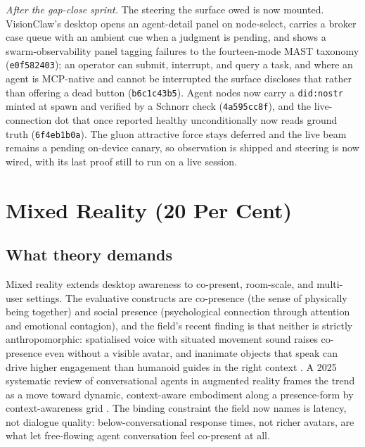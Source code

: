 \emph{After the gap-close sprint.} The steering the surface owed is now mounted. VisionClaw's desktop opens an agent-detail panel on node-select, carries a broker case queue with an ambient cue when a judgment is pending, and shows a swarm-observability panel tagging failures to the fourteen-mode MAST taxonomy (\texttt{e0f582403}); an operator can submit, interrupt, and query a task, and where an agent is MCP-native and cannot be interrupted the surface discloses that rather than offering a dead button (\texttt{b6c1c43b5}). Agent nodes now carry a \texttt{did:nostr} minted at spawn and verified by a Schnorr check (\texttt{4a595cc8f}), and the live-connection dot that once reported healthy unconditionally now reads ground truth (\texttt{6f4eb1b0a}). The gluon attractive force stays deferred and the live beam remains a pending on-device canary, so observation is shipped and steering is now wired, with its last proof still to run on a live session.

\section{Mixed Reality (20 Per Cent)}

\subsection{What theory demands}

Mixed reality extends desktop awareness to co-present, room-scale, and multi-user settings. The evaluative constructs are co-presence (the sense of physically being together) and social presence (psychological connection through attention and emotional contagion), and the field's recent finding is that neither is strictly anthropomorphic: spatialised voice with situated movement sound raises co-presence even without a visible avatar, and inanimate objects that speak can drive higher engagement than humanoid guides in the right context \parencite{Schmid2024Objects}. A 2025 systematic review of conversational agents in augmented reality frames the trend as a move toward dynamic, context-aware embodiment along a presence-form by context-awareness grid \parencite{ARCASurvey2025}. The binding constraint the field now names is latency, not dialogue quality: below-conversational response times, not richer avatars, are what let free-flowing agent conversation feel co-present at all.

